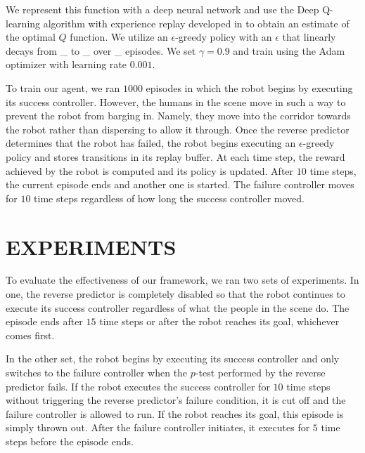 \documentclass[letterpaper, 10 pt, conference]{ieeeconf}  %
\begin{document}
		We represent this function with a deep neural network and use the Deep Q-learning algorithm with experience replay developed in \cite{dqn} to obtain an estimate of the optimal $Q$ function. We utilize an $\epsilon$-greedy policy with an $\epsilon$ that linearly decays from \_ to \_ over \_ episodes. We set $\gamma=0.9$ and train using the Adam optimizer with learning rate $0.001$. 
		
		To train our agent, we ran $1000$ episodes in which the robot begins by executing its success controller. However, the humans in the scene move in such a way to prevent the robot from barging in. Namely, they move into the corridor towards the robot rather than dispersing to allow it through. Once the reverse predictor determines that the robot has failed, the robot begins executing an $\epsilon$-greedy policy and stores transitions in its replay buffer. At each time step, the reward achieved by the robot is computed and its policy is updated. After $10$ time steps, the current episode ends and another one is started. The failure controller moves for $10$ time steps regardless of how long the success controller moved. 
		
\section{EXPERIMENTS}\label{sec:experiments}
	To evaluate the effectiveness of our framework, we ran two sets of experiments. In one, the reverse predictor is completely disabled so that the robot continues to execute its success controller regardless of what the people in the scene do. The episode ends after $15$ time steps or after the robot reaches its goal, whichever comes first.
	
	In the other set, the robot begins by executing its success controller and only switches to the failure controller when the $p$-test performed by the reverse predictor fails. If the robot executes the success controller for $10$ time steps without triggering the reverse predictor's failure condition, it is cut off and the failure controller is allowed to run. If the robot reaches its goal, this episode is simply thrown out. After the failure controller initiates, it executes for $5$ time steps before the episode ends. 
	
\end{document}
